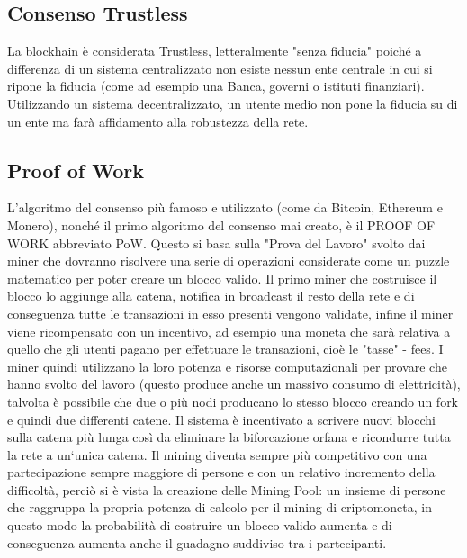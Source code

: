 \documentclass[11pt,a4paper,titlepage]{report}
\begin{document}
\subsection{Consenso Trustless}
La blockhain è considerata Trustless, letteralmente "senza fiducia" poiché a differenza di un sistema centralizzato non esiste nessun ente centrale in cui si ripone la fiducia (come ad esempio una Banca, governi o istituti finanziari). Utilizzando un sistema decentralizzato, un utente medio non pone la fiducia su di un ente ma farà affidamento alla robustezza della rete. %

\subsection{Proof of Work}
L'algoritmo del consenso più famoso e utilizzato (come da Bitcoin, Ethereum e Monero), nonché il primo algoritmo del consenso mai creato, è il PROOF OF WORK abbreviato PoW. Questo si basa sulla "Prova del Lavoro" svolto dai miner che dovranno risolvere una serie di operazioni considerate come un puzzle matematico per poter creare un blocco valido. Il primo miner che costruisce il blocco lo aggiunge alla catena, notifica in broadcast il resto della rete e di conseguenza tutte le transazioni in esso presenti vengono validate, infine il miner viene ricompensato con un incentivo, ad esempio una moneta che sarà relativa a quello che gli utenti pagano per effettuare le transazioni, cioè le "tasse" - fees. I miner quindi utilizzano la loro potenza e risorse computazionali per provare che hanno svolto del lavoro (questo produce anche un massivo consumo di elettricità), talvolta è possibile che due o più nodi producano lo stesso blocco creando un fork e quindi due differenti catene. Il sistema è incentivato a scrivere nuovi blocchi sulla catena più lunga così da eliminare la biforcazione orfana e ricondurre tutta la rete a un`unica catena. Il mining diventa sempre più competitivo con una partecipazione sempre maggiore di persone e con un relativo incremento della difficoltà, perciò si è vista la creazione delle Mining Pool: un insieme di persone che raggruppa la propria potenza di calcolo per il mining di criptomoneta, in questo modo la probabilità di costruire un blocco valido aumenta e di conseguenza aumenta anche il guadagno suddiviso tra i partecipanti.
\end{document}
